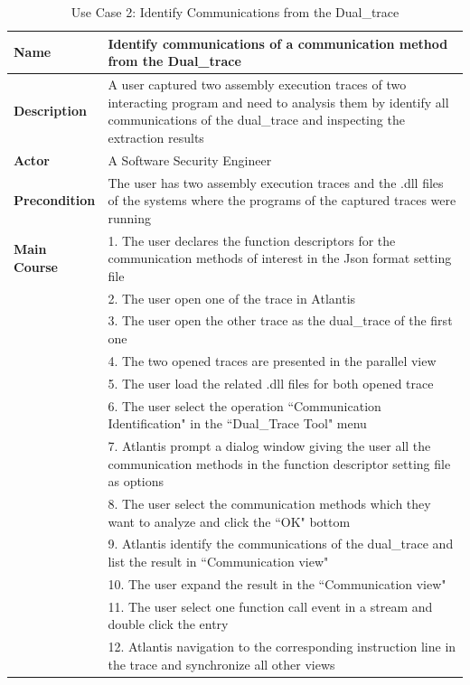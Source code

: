 \begin{table}[H]
  \centering
  \caption{Use Case 2: Identify Communications from the Dual\_trace}
  \label{usecase2}
  \begin{tabular}{|l|p{13cm}|}
      \hline
       \textbf{Name} & Identify communications of a communication method from the Dual\_trace\\
       \hline
       \textbf{Description} & A user captured two assembly execution traces of two interacting program and need to analysis them by identify all communications of the dual\_trace and inspecting the extraction results \\
       \hline
              \textbf{Actor} & A Software Security Engineer \\
       \hline
      \textbf{Precondition} & The user has two assembly execution traces and the .dll files of the systems where the programs of the captured traces were running\\
       \hline
       \textbf{Main Course}& 1. The user declares the function descriptors for the communication methods of interest in the Json format setting file\\
        & 2. The user open one of the trace in Atlantis\\
       &  3. The user open the other trace as the dual\_trace of the first one\\
       & 4. The two opened traces are presented in the parallel view\\
       & 5. The user load the related .dll files for both opened trace\\
       & 6. The user select the operation ``Communication Identification" in the ``Dual\_Trace Tool" menu\\
      & 7. Atlantis prompt a dialog window giving the user all the communication methods in the function descriptor setting file as options\\
       & 8. The user select the communication methods which they want to analyze and click the ``OK" bottom\\
       & 9. Atlantis identify the communications of the dual\_trace and list the result in ``Communication view"\\
       & 10. The user expand the result in the ``Communication view"\\
       & 11. The user select one function call event in a stream and double click the entry\\
       & 12. Atlantis navigation to the corresponding instruction line in the trace and synchronize all other views\\
      \hline               
  \end{tabular}
\end{table}

